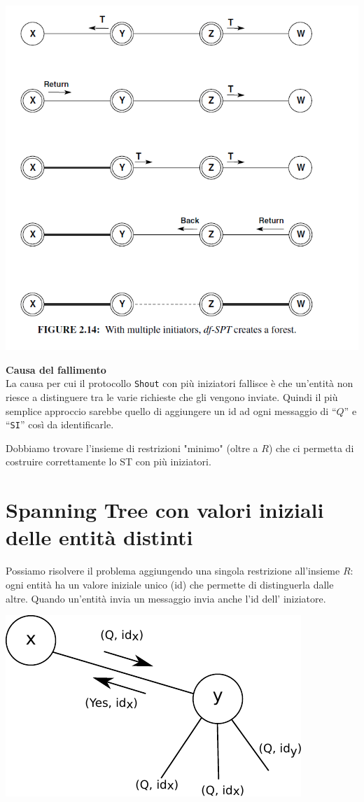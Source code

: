 \begin{center}
    \includegraphics[scale=0.6]{capitoli/attraversamento/imgs/asd.png}
\end{center}

\textbf{Causa del fallimento}\\
La causa per cui il protocollo \texttt{Shout} con più iniziatori fallisce è che
un'entità non riesce a distinguere tra le varie richieste che gli vengono
inviate. Quindi il più semplice approccio sarebbe quello di aggiungere un id ad
ogni messaggio di ``$Q$'' e ``\texttt{SI}'' così da identificarle.

Dobbiamo trovare l'insieme di restrizioni "minimo" (oltre a $R$) che ci permetta
di costruire correttamente lo ST con più iniziatori.

\section{Spanning Tree con valori iniziali delle entità distinti}
Possiamo risolvere il problema aggiungendo una singola restrizione all'insieme
$R$: ogni entità ha un valore iniziale unico (id) che permette di distinguerla
dalle altre. Quando un'entità invia un messaggio invia anche l'id dell'
iniziatore.

\begin{center}
    \includegraphics[scale=0.8]{capitoli/costruzione-spanning-tree/imgs/n_38}
\end{center}

